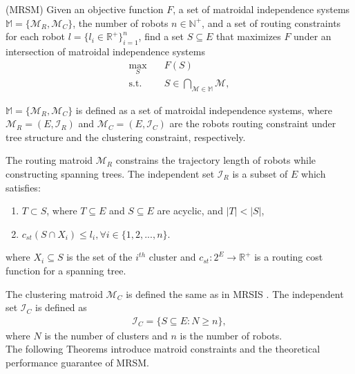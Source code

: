 \begin{problem} \label{prob:objective-Mat}
    (MRSM) Given an objective function $F$, a set of matroidal independence systems $\mathit{\mathbb{M}} = \{\mathcal{M}_R , \mathcal{M}_C\}$, the number of robots $n \in \mathbb{N}^+$, and a set of routing constraints for each robot $l = \{l_i \in \mathbb{R}^+\}_{i=1}^n$, find a set $S \subseteq E$ that maximizes $F$ under an intersection of matroidal independence systems
    \begin{equation} \label{eq:objective-Mat}
        \begin{aligned}
            \max_{S} \quad & F(S) \\
            \textrm{s.t.} \quad & S \in \bigcap_{\mathcal{M}\in \mathit{\mathbb{M}}} \mathcal{M},
        \end{aligned}
\end{equation}
\end{problem}

$\mathit{\mathbb{M}} = \{\mathcal{M}_R , \mathcal{M}_C\}$ is defined as a set of matroidal independence systems, where $\mathcal{M}_R=(E, \mathcal{I}_R)$ and $\mathcal{M}_C=(E, \mathcal{I}_C)$ are the robots routing constraint under tree structure and the clustering constraint, respectively.

The routing matroid $\mathcal{M}_R$ constrains the trajectory length of robots while constructing spanning trees.
The independent set $\mathcal{I}_R$ is a subset of $E$ which satisfies:
\begin{enumerate}
    \item $T \subset S$, where $T \subseteq E$ and $S \subseteq E$ are acyclic, and $|T| < |S|$,
    \item $c_{st}(S \cap X_i) \leq l_i , \forall i\in \{1,2,...,n\}$.
\end{enumerate}
where $X_i \subseteq S$ is the set of the $i^{th}$ cluster and $c_{st}:2^E \rightarrow \mathbb{R}^+$ is a routing cost function for a spanning tree.

The clustering matroid $\mathcal{M}_C$ is defined the same as in MRSIS \cite{li2024mrsis}.
The independent set $\mathcal{I}_C$ is defined as
\begin{align*}
    \mathcal{I}_C=\{S \subseteq E : N \geq n \},
\end{align*}
where $N$ is the number of clusters and $n$ is the number of robots. \\

The following Theorems introduce matroid constraints and the theoretical performance guarantee of MRSM.


